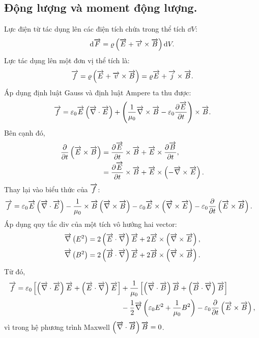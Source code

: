 \begin{appendices}
\subsection{Động lượng và moment động lượng.}
Lực điện từ tác dụng lên các điện tích chứa trong thể tích $\dd V$:
$$\mathrm{d}\overrightarrow{F}=\varrho\left(\overrightarrow{E}+\overrightarrow{v}\times\overrightarrow{B}\right)\mathrm{d} V.$$
Lực tác dụng lên một đơn vị thể tích là:
$$\overrightarrow{f}=\varrho\left(\overrightarrow{E}+\overrightarrow{v}\times\overrightarrow{B}\right)=\varrho\overrightarrow{E}+\overrightarrow{j}\times\overrightarrow{B}.$$
Áp dụng định luật Gauss và định luật Ampere ta thu được:
$$\overrightarrow{f}=\varepsilon_0\overrightarrow{E}\left(\overrightarrow{\nabla}\cdot\overrightarrow{E}\right)+\left(\dfrac{1}{\mu_0}\overrightarrow{\nabla}\times\overrightarrow{B}-\varepsilon_0\dfrac{\partial \overrightarrow{E}}{\partial t}\right)\times\overrightarrow{B}.$$
Bên cạnh đó,
\begin{align*}
\dfrac{\partial}{\partial t}\left(\overrightarrow{E}\times\overrightarrow{B}\right)&=\dfrac{\partial\overrightarrow{E}}{\partial t}\times\overrightarrow{B}+\overrightarrow{E}\times\dfrac{\partial\overrightarrow{B}}{\partial t},\\
&=\dfrac{\partial\overrightarrow{E}}{\partial t}\times\overrightarrow{B}+\overrightarrow{E}\times\left(-\overrightarrow{\nabla}\times\overrightarrow{E}\right).
\end{align*}
Thay lại vào biểu thức của $\overrightarrow{f}$:
\begin{align*}
\overrightarrow{f}&=\varepsilon_0\overrightarrow{E}\left(\overrightarrow{\nabla}\cdot\overrightarrow{E}\right)-\dfrac{1}{\mu_0}\times\overrightarrow{B}\left(\overrightarrow{\nabla}\times\overrightarrow{B}\right)-\varepsilon_0\overrightarrow{E}\times\left(\overrightarrow{\nabla}\times\overrightarrow{E}\right)-\varepsilon_0\dfrac{\partial}{\partial t}\left(\overrightarrow{E}\times\overrightarrow{B}\right).
\end{align*}
Áp dụng quy tắc div của một tích vô hướng hai vector:
\begin{align*}
\overrightarrow{\nabla}\left(E^2\right)=2\left(\overrightarrow{E}\cdot\overrightarrow{\nabla}\right)\overrightarrow{E}+2\overrightarrow{E}\times\left(\overrightarrow{\nabla}\times\overrightarrow{E}\right),\\
\overrightarrow{\nabla}\left(B^2\right)=2\left(\overrightarrow{B}\cdot\overrightarrow{\nabla}\right)\overrightarrow{E}+2\overrightarrow{B}\times\left(\overrightarrow{\nabla}\times\overrightarrow{B}\right).
\end{align*}
Từ đó,
\begin{align*}
	\overrightarrow{f}=\varepsilon_0\left[\left(\overrightarrow{\nabla}\cdot\overrightarrow{E}\right)\overrightarrow{E}+\left(\overrightarrow{E}\cdot\overrightarrow{\nabla}\right)\overrightarrow{E}\right]&+\dfrac{1}{\mu_0}\left[\left(\overrightarrow{\nabla}\cdot\overrightarrow{B}\right)\overrightarrow{B}+\left(\overrightarrow{B}\cdot\overrightarrow{\nabla}\right)\overrightarrow{B}\right]\\
	&-\dfrac{1}{2}\overrightarrow{\nabla}\left(\varepsilon_0E^2+\dfrac{1}{\mu_0}B^2\right)-\varepsilon_0\dfrac{\partial}{\partial t}\left(\overrightarrow{E}\times\overrightarrow{B}\right),
\end{align*}
vì trong hệ phương trình Maxwell $\left(\overrightarrow{\nabla}\cdot\overrightarrow{B}\right)\overrightarrow{B}=0$.


\end{appendices}
